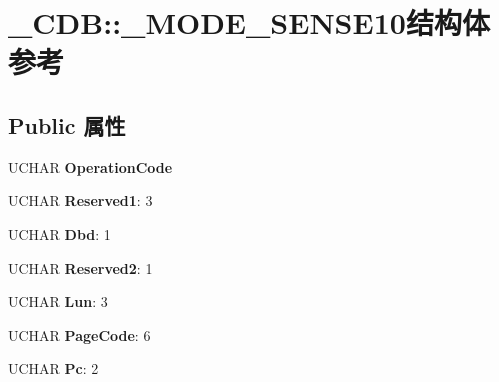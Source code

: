 \hypertarget{struct___c_d_b_1_1___m_o_d_e___s_e_n_s_e10}{}\section{\+\_\+\+C\+DB\+:\+:\+\_\+\+M\+O\+D\+E\+\_\+\+S\+E\+N\+S\+E10结构体 参考}
\label{struct___c_d_b_1_1___m_o_d_e___s_e_n_s_e10}
\subsection*{Public 属性}
\begin{DoxyCompactItemize}
\item 
\mbox{\label{struct___c_d_b_1_1___m_o_d_e___s_e_n_s_e10_a32292c95505dcfa501bdc01ec18907a7}} 
U\+C\+H\+AR {\bfseries Operation\+Code}
\item 
\mbox{\label{struct___c_d_b_1_1___m_o_d_e___s_e_n_s_e10_a9c0b12fa27121b9f8c1ac958c7fe73e1}} 
U\+C\+H\+AR {\bfseries Reserved1}\+: 3
\item 
\mbox{\label{struct___c_d_b_1_1___m_o_d_e___s_e_n_s_e10_ac33f063b2d4a59940037a7cbb5788358}} 
U\+C\+H\+AR {\bfseries Dbd}\+: 1
\item 
\mbox{\label{struct___c_d_b_1_1___m_o_d_e___s_e_n_s_e10_a63c2f48f9fa70000436116e87eca5ef7}} 
U\+C\+H\+AR {\bfseries Reserved2}\+: 1
\item 
\mbox{\label{struct___c_d_b_1_1___m_o_d_e___s_e_n_s_e10_ab77575d41f7b7a4530f2c5cab34e85aa}} 
U\+C\+H\+AR {\bfseries Lun}\+: 3
\item 
\mbox{\label{struct___c_d_b_1_1___m_o_d_e___s_e_n_s_e10_a3fa41ab94b9bab678d9bed0cd5da5c1c}} 
U\+C\+H\+AR {\bfseries Page\+Code}\+: 6
\item 
\mbox{\label{struct___c_d_b_1_1___m_o_d_e___s_e_n_s_e10_a529890b2065f1ea19aa3d7f656504950}} 
U\+C\+H\+AR {\bfseries Pc}\+: 2

\end{DoxyCompactItemize}

